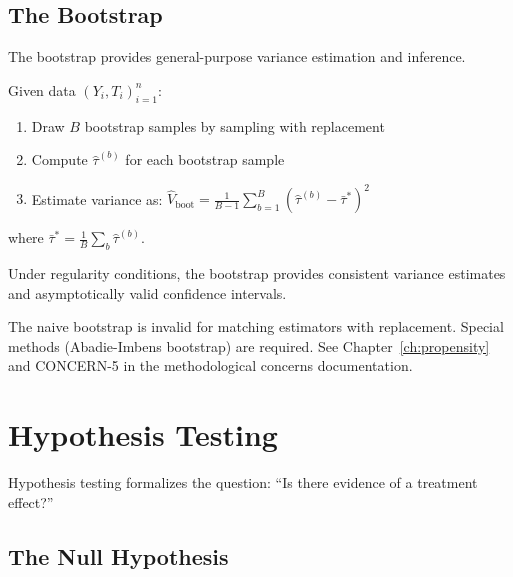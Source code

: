 \subsection{The Bootstrap}

The bootstrap provides general-purpose variance estimation and inference.

\begin{definition}[Bootstrap]
\label{def:bootstrap}
Given data $(Y_i, T_i)_{i=1}^{n}$:
\begin{enumerate}
    \item Draw $B$ bootstrap samples by sampling with replacement
    \item Compute $\hat{\tau}^{(b)}$ for each bootstrap sample
    \item Estimate variance as: $\hat{V}_{\text{boot}} = \frac{1}{B-1} \sum_{b=1}^{B} (\hat{\tau}^{(b)} - \bar{\tau}^*)^2$
\end{enumerate}
where $\bar{\tau}^* = \frac{1}{B} \sum_b \hat{\tau}^{(b)}$.
\end{definition}

\begin{proposition}
Under regularity conditions, the bootstrap provides consistent variance estimates and asymptotically valid confidence intervals.
\end{proposition}

\begin{remark}
The naive bootstrap is invalid for matching estimators with replacement. Special methods (Abadie-Imbens bootstrap) are required. See Chapter~\ref{ch:propensity} and CONCERN-5 in the methodological concerns documentation.
\end{remark}


\section{Hypothesis Testing}
\label{sec:hypothesis_testing}

Hypothesis testing formalizes the question: ``Is there evidence of a treatment effect?''

\subsection{The Null Hypothesis}


